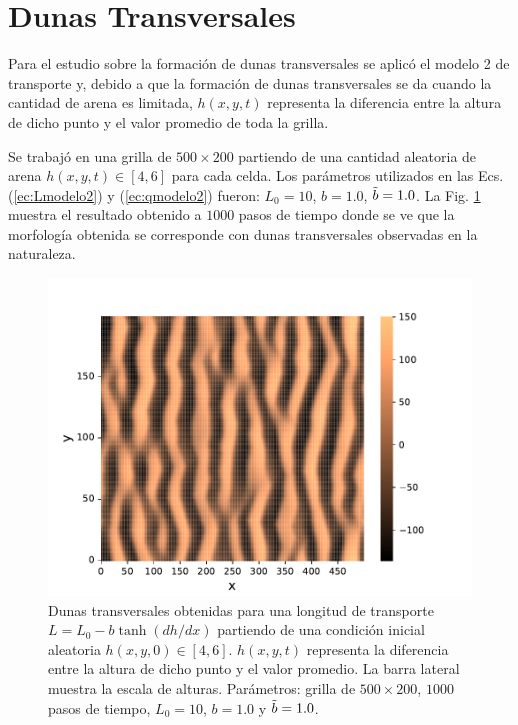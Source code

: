 \documentclass[11pt,twocolumn,twoside]{opticajnl}
\begin{document}
\section{Dunas Transversales \label{sec:dunas_transversales}}

Para el estudio sobre la formación de dunas transversales se aplicó el modelo 2 de transporte y, debido a que la formación de dunas transversales se da cuando la cantidad de arena es limitada, $h(x,y,t)$ representa la diferencia entre la altura de dicho punto y el valor promedio de toda la grilla.

Se trabajó en una grilla de $500\times200$ partiendo de una cantidad aleatoria de arena $h(x,y,t) \in [4,6]$ para cada celda. Los parámetros utilizados en las Ecs. (\ref{ec:Lmodelo2}) y (\ref{ec:qmodelo2}) fueron: $L_0 =10$, $b=1.0$, $\Tilde{b} = 1.0$. La Fig. \ref{fig:dunas_transversales} muestra el resultado obtenido a $1000$ pasos de tiempo donde se ve que la morfología obtenida se corresponde con dunas transversales observadas en la naturaleza. 

\begin{figure}[H]
\centering
\includegraphics[width=\linewidth]{Figuras/dunas_transversales.pdf}
\caption{ \centering Dunas transversales obtenidas para una longitud de transporte $L = L_0 - b \tanh{  (dh/dx) }$ partiendo de una condición inicial aleatoria $h(x,y,0) \in [4,6]$. $h(x,y,t)$ representa la diferencia entre la altura de dicho punto y el valor promedio. La barra lateral muestra la escala de alturas. Parámetros: grilla de $500 \times 200$, $1000$ pasos de tiempo, $L_0 = 10$, $b=1.0$ y $\Tilde{b}=1.0$.}
\label{fig:dunas_transversales}
\end{figure}
\end{document}
